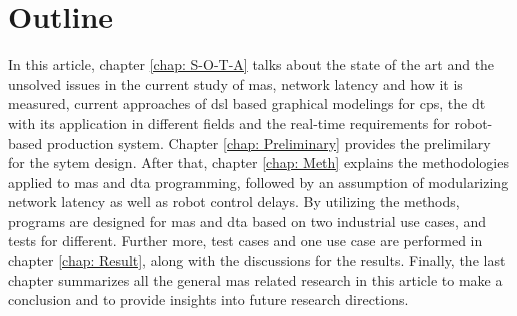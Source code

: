 \section{Outline}
In this article, chapter \ref{chap: S-O-T-A} talks about the state of the art and 
the unsolved issues in the current study of \gls{mas}, network 
latency and how it is measured, current approaches of \gls{dsl} 
based graphical modelings for \gls{cps}, the \gls{dt} with 
its application in different fields and the real-time requirements 
for robot-based production system. Chapter \ref{chap: Preliminary} 
provides the prelimilary for the sytem design. After that, 
chapter \ref{chap: Meth} explains 
the methodologies applied to \gls{mas} and \gls{dta} programming, 
followed by an assumption of modularizing network latency as well 
as robot control delays. By utilizing the methods, programs are 
designed for \gls{mas} and \gls{dta} based on two industrial use cases, 
and tests for different. Further more, test cases and one use case are 
performed in chapter \ref{chap: Result}, along with 
the discussions for the results. Finally, the last chapter summarizes 
all the general \gls{mas} related research in this article to make a 
conclusion and to provide insights into future research directions.  